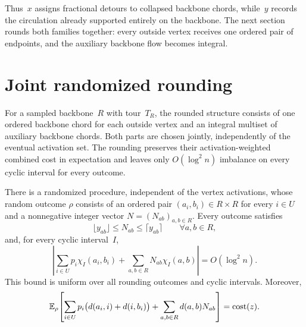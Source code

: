 \documentclass[12pt,a4paper,oneside]{report}
\begin{document}
Thus~$x$ assigns fractional detours to collapsed backbone chords, while~$y$
records the circulation already supported entirely on the backbone.  The
next section rounds both families together: every outside vertex receives one
ordered pair of endpoints, and the auxiliary backbone flow becomes integral.

\section{Joint randomized rounding}
\label{sec:joint-circulation-rounding}

For a sampled backbone~$R$ with tour~$T_R$, the rounded structure consists of
one ordered backbone chord for each outside vertex and an integral multiset of
auxiliary backbone chords.  Both parts are chosen jointly, independently of
the eventual activation set.  The rounding preserves their
activation-weighted combined cost in expectation and leaves only
$O(\log^2 n)$ imbalance on every cyclic interval for every outcome.

\begin{lemma}
\label{lem:joint-circulation-rounding}
There is a randomized procedure, independent of the vertex activations, whose
random outcome $\rho$ consists of an ordered pair $(a_i,b_i)\in R\times R$
for every $i\in U$ and a
nonnegative integer vector $N=(N_{ab})_{a,b\in R}$.  Every
outcome satisfies
\[
    \lfloor y_{ab}\rfloor\le N_{ab}\le\lceil y_{ab}\rceil
    \qquad\forall a,b\in R,
\]
and, for every cyclic interval~$I$,
\begin{equation}
    \left|
     \sum_{i\in U}p_i\chi_I(a_i,b_i)
       +\sum_{a,b\in R}N_{ab}\chi_I(a,b)
     \right|
      =O(\log^2 n).
    \label{eq:joint-rounding-interval}
\end{equation}
This bound is uniform over all rounding outcomes and cyclic intervals.
Moreover,
\begin{equation}
    \mathbb{E}_\rho\!\left[
      \sum_{i\in U}p_i
       \bigl(d(a_i,i)+d(i,b_i)\bigr)
      +\sum_{a,b\in R}d(a,b)N_{ab}
    \right]
    =\operatorname{cost}(z).
    \label{eq:joint-rounding-cost}
\end{equation}
\end{lemma}
\end{document}
